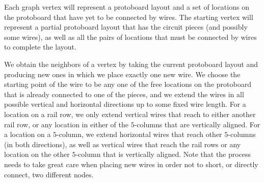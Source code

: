 Each graph vertex will represent a protoboard layout and a set of locations on
the protoboard that have yet to be connected by wires. The starting vertex will
represent a partial protoboard layout that has the circuit pieces (and possibly
some wires), as well as all the pairs of locations that must be connected by
wires to complete the layout.

We obtain the neighbors of a vertex by taking the current protoboard layout and
producing new ones in which we place exactly one new wire. We
choose the starting point of the wire to be any one of the free locations on the
protoboard that is already connected to one of the pieces, and we extend the
wires in all possible vertical and horizontal directions up to some fixed wire
length. For a location on a rail row, we only extend vertical wires that reach
to either another rail row, or any location in either of the $5$-columns that
are vertically aligned.
For a location on a $5$-column, we extend horizontal wires that reach other
$5$-columns (in both directions), as well as
vertical wires that reach the rail rows or any location on the other
$5$-column that is vertically aligned.
Note that the process needs
to take great care when placing new wires in order not to short, or directly
connect, two different nodes.

